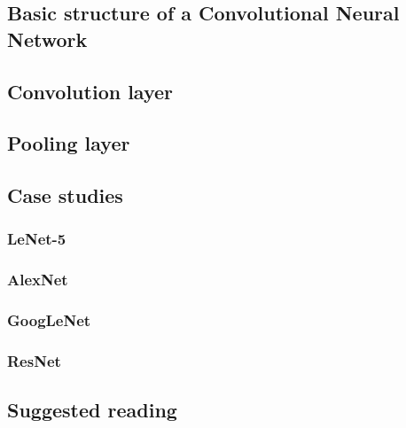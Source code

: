 \subsection{Basic structure of a Convolutional Neural Network}

\subsection{Convolution layer}

\subsection{Pooling layer}




\subsection{Case studies}
\subsubsection{LeNet-5}

\subsubsection{AlexNet}

\subsubsection{GoogLeNet}

\subsubsection{ResNet}


%

%

\subsection{Suggested reading}


